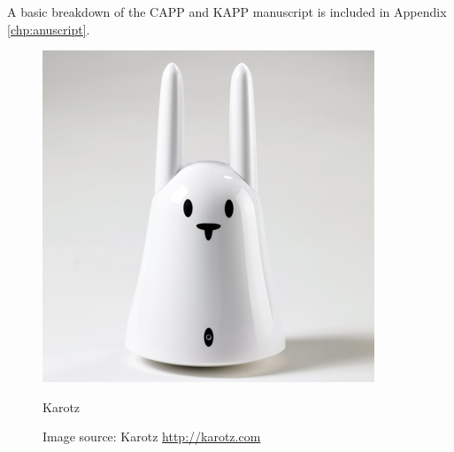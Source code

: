 A basic breakdown of the CAPP and KAPP manuscript is included in Appendix \ref{chp:anuscript}. 


\begin{figure}[H]
	\begin{minipage}[b]{0.4\linewidth}
		\centering
			\includegraphics[width=0.20\paperwidth]{Pictures/karotz.jpg}
		\caption{Karotz}
		\caption*{Image source: Karotz \url{http://karotz.com}}
		\label{fig:karotz}
	\end{minipage}
	\hspace{3cm}
	\begin{minipage}[b]{0.4\linewidth}
	\centering

\end{minipage}
\end{figure}
